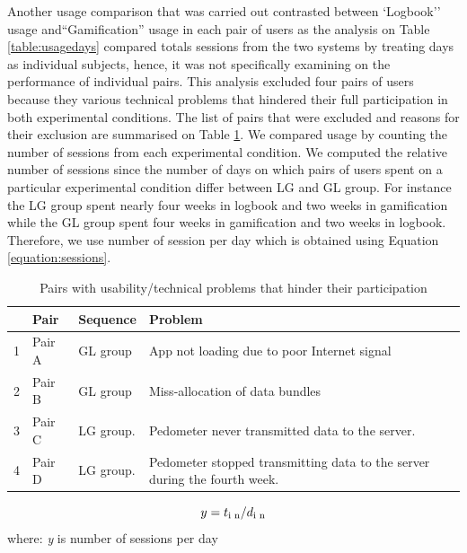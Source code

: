 \documentclass{sig-alternate}
\def\SB#1{\textsubscript{\textcolor{black}{#1}}}
\begin{document}
Another usage comparison that was carried out contrasted between `Logbook'' usage and``Gamification'' usage in each pair of users as the analysis on Table \ref{table:usagedays} compared totals sessions from the two systems by treating days as individual subjects, hence, it  was not specifically examining on the performance of individual pairs. This analysis excluded four pairs of users because they various technical problems that hindered their full participation in both experimental conditions. The list of pairs that were excluded and reasons for their exclusion are summarised on Table \ref{table:usageproblems}. \newline
We compared usage by counting the number of sessions from each experimental condition. We computed the relative number of sessions since the number of days on which pairs of users spent on a particular experimental condition differ between LG and GL group. For instance the LG group spent nearly four weeks in logbook and two weeks in gamification while the GL group spent four weeks in gamification and two weeks in logbook. Therefore, we use number of session per day which is obtained using Equation \ref{equation:sessions}.\newline
\begin{table}[h!]
  \begin{center}
    \caption{Pairs with usability/technical problems that hinder their participation}
    \label{table:usageproblems}
	\begin{tabular}{|l|p{1cm}|p{2cm}|p{3.5cm}|}
		\hline
		&Pair&Sequence&Problem\\
		\hline
		1&Pair A&GL group &App not loading due to poor Internet signal\\
		\hline
		2&Pair B&GL group& Miss-allocation of data bundles  \\
		\hline
		3&Pair C & LG group.& Pedometer never transmitted data to the server.\\
		\hline
		4&Pair D & LG group.& Pedometer stopped transmitting data to the server during the fourth week.\\
	\hline
	\end{tabular}
  \end{center}
\end{table}
\begin{equation}
\label{equation:sessions}
y=t\SB{i n}/d\SB{i n}
\end{equation} \newline
where:\newline
\emph{y} is number of sessions per day\newline
\end{document}
